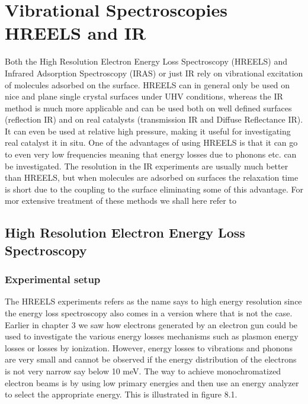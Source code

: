 \newpage
\chapter{Vibrational Spectroscopies HREELS and IR}

Both the High Resolution Electron Energy Loss Spectroscopy (HREELS) and Infrared Adsorption Spectroscopy (IRAS) or just IR  rely on vibrational excitation of molecules adsorbed on the surface. HREELS can in general only be used on nice and plane single crystal surfaces under UHV conditions, whereas the IR method is much more applicable and can be used both on well defined surfaces (reflection IR) and on real catalysts (transmission IR and Diffuse Reflectance IR). It can even be used at relative high pressure, making it useful for investigating real catalyst {it in situ}. One of the advantages of using HREELS is that it can go to even very low frequencies meaning that energy losses due to phonons etc. can be investigated. The resolution in the IR experiments are usually much better than HREELS, but when molecules are adsorbed on surfaces the relaxation time is short due to the coupling  to the surface eliminating some of this advantage. For mor extensive treatment of these methods we shall here refer to \cite{Ibach,Ertl,Zangwill} 


\section{High Resolution Electron Energy Loss Spectroscopy}
\subsection{Experimental setup}

The HREELS experiments refers as the name says to high energy resolution since the energy loss spectroscopy also comes in a version where that is not the case. Earlier in chapter 3 we saw how electrons generated by an electron gun could be used to investigate the various energy losses mechanisms such as plasmon energy losses or losses by ionization. However, energy losses to vibrations and phonons are very small and cannot be observed if the energy distribution of the electrons is not very narrow say below 10 meV. The way to achieve monochromatized electron beams is by using low primary energies and then use an energy analyzer to select the appropriate energy. This is illustrated in figure 8.1.

\vspace*{11cm}

